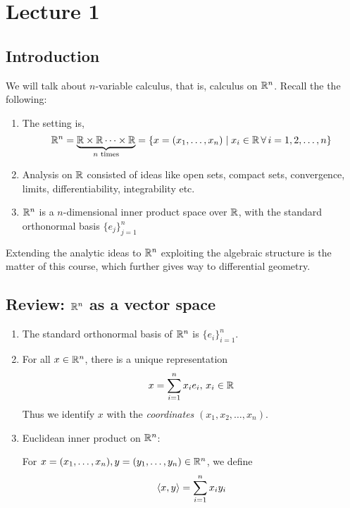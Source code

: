 \documentclass[../Analysis-3]{subfiles}
\begin{document}
\chapter*{Lecture 1} %
\setcounter{chapter}{1} %
\setcounter{section}{0}

\section{Introduction}
We will talk about $ n $-variable calculus, that is, calculus on $ \mathbb{R}^n $. Recall the the following:
\begin{enumerate}[label = $\bullet$]
      \item The setting is,
            \[ \mathbb{R}^n = \underbrace{\mathbb{R} \times \mathbb{R} \cdots \times \mathbb{R}}_{n \text{ times}} = \{x = (x_1, \dots, x_n) \mid x_i \in \mathbb{R} \, \forall \, i = 1,2, \dots, n\} \]
      \item Analysis on $ \mathbb{R} $ consisted of ideas like open sets, compact sets, convergence, limits, differentiability, integrability etc.
      \item $ \mathbb{R}^n $ is a $ n $-dimensional inner product space over $ \mathbb{R} $, with the standard orthonormal basis $ \{e_j\}_{j=1}^n $
\end{enumerate}

Extending the analytic ideas to $ \mathbb{R}^n $ exploiting the algebraic structure is the matter of this course, which further gives way to differential geometry.

\section{Review: $ \mathbb{R}^n $ as a vector space}

\begin{enumerate}[label = (\roman*)]
      \item The standard orthonormal basis of $ \mathbb{R}^n $ is $ \{e_i\}_{i=1}^n $.
      \item For all $ x \in \mathbb{R}^n $, there is a unique representation
            \[ x = \sum_{i=1}^n x_i e_i, \, x_i \in \mathbb{R} \]
            Thus we identify $ x $ with the \textit{coordinates} $ (x_1,x_2, \dots, x_n) $.
      \item Euclidean inner product on $ \mathbb{R}^n $:

            For $ x = (x_1, \dots, x_n), y = (y_1, \dots, y_n) \in \mathbb{R}^n $, we define
            \[ \left\langle {x}, {y} \right\rangle = \sum_{i=1}^{n} x_iy_i \]
\end{enumerate}
\end{document}
